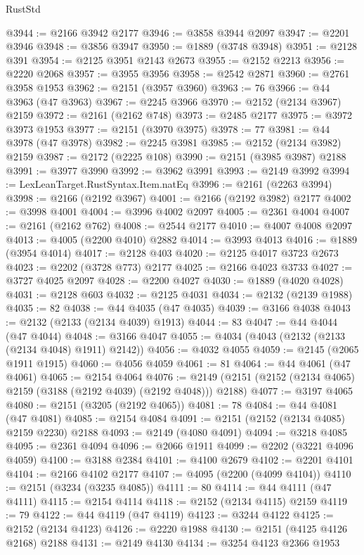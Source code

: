 \begin{lexlean}{RustStd}
\begin{coremodule}
@3944 := @2166 @3942 @2177
@3946 := @3858 @3944 @2097
@3947 := @2201 @3946
@3948 := @3856 @3947
@3950 := @1889 (@3748 @3948)
@3951 := @2128 @391
@3954 := @2125 @3951 @2143 @2673
@3955 := @2152 @2213
@3956 := @2220 @2068
@3957 := @3955 @3956
@3958 := @2542 @2871
@3960 := @2761 @3958 @1953
@3962 := @2151 (@3957 @3960)
@3963 := 76
@3966 := @44 @3963 (@47 @3963)
@3967 := @2245 @3966
@3970 := @2152 (@2134 @3967) @2159
@3972 := @2161 (@2162 @748)
@3973 := @2485 @2177
@3975 := @3972 @3973 @1953
@3977 := @2151 (@3970 @3975)
@3978 := 77
@3981 := @44 @3978 (@47 @3978)
@3982 := @2245 @3981
@3985 := @2152 (@2134 @3982) @2159
@3987 := @2172 (@2225 @108)
@3990 := @2151 (@3985 @3987) @2188
@3991 := @3977 @3990
@3992 := @3962 @3991
@3993 := @2149 @3992
@3994 := LexLeanTarget.RustSyntax.Item.natEq
@3996 := @2161 (@2263 @3994)
@3998 := @2166 (@2192 @3967)
@4001 := @2166 (@2192 @3982) @2177
@4002 := @3998 @4001
@4004 := @3996 @4002 @2097
@4005 := @2361 @4004
@4007 := @2161 (@2162 @762)
@4008 := @2544 @2177
@4010 := @4007 @4008 @2097
@4013 := @4005 (@2200 @4010) @2882
@4014 := @3993 @4013
@4016 := @1889 (@3954 @4014)
@4017 := @2128 @403
@4020 := @2125 @4017 @3723 @2673
@4023 := @2202 (@3728 @773) @2177
@4025 := @2166 @4023 @3733
@4027 := @3727 @4025 @2097
@4028 := @2200 @4027
@4030 := @1889 (@4020 @4028)
@4031 := @2128 @603
@4032 := @2125 @4031
@4034 := @2132 (@2139 @1988)
@4035 := 82
@4038 := @44 @4035 (@47 @4035)
@4039 := @3166 @4038
@4043 := @2132 (@2133 (@2134 @4039) @1913)
@4044 := 83
@4047 := @44 @4044 (@47 @4044)
@4048 := @3166 @4047
@4055 := @4034 (@4043 (@2132 (@2133 (@2134 @4048) @1911) @2142))
@4056 := @4032 @4055
@4059 := @2145 (@2065 @1911 @1915)
@4060 := @4056 @4059
@4061 := 81
@4064 := @44 @4061 (@47 @4061)
@4065 := @2154 @4064
@4076 := @2149 (@2151 (@2152 (@2134 @4065) @2159 (@3188 (@2192 @4039) (@2192 @4048))) @2188)
@4077 := @3197 @4065
@4080 := @2151 (@3205 (@2192 @4065))
@4081 := 78
@4084 := @44 @4081 (@47 @4081)
@4085 := @2154 @4084
@4091 := @2151 (@2152 (@2134 @4085) @2159 @2230) @2188
@4093 := @2149 (@4080 @4091)
@4094 := @3218 @4085
@4095 := @2361 @4094
@4096 := @2066 @1911
@4099 := @2202 (@3221 @4096 @4059)
@4100 := @3188 @2384
@4101 := @4100 @2679
@4102 := @2201 @4101
@4104 := @2166 @4102 @2177
@4107 := @4095 (@2200 (@4099 @4104))
@4110 := @2151 (@3234 (@3235 @4085))
@4111 := 80
@4114 := @44 @4111 (@47 @4111)
@4115 := @2154 @4114
@4118 := @2152 (@2134 @4115) @2159
@4119 := 79
@4122 := @44 @4119 (@47 @4119)
@4123 := @3244 @4122
@4125 := @2152 (@2134 @4123)
@4126 := @2220 @1988
@4130 := @2151 (@4125 @4126 @2168) @2188
@4131 := @2149 @4130
@4134 := @3254 @4123 @2366 @1953

\end{coremodule}
\end{lexlean}
